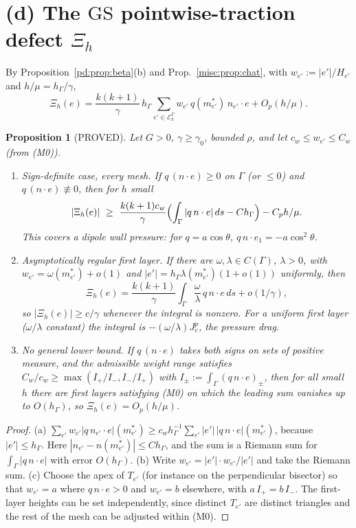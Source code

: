 \documentclass[11pt,reqno]{amsart}
\theoremstyle{plain}
\newtheorem{proposition}[theorem]{Proposition}
\theoremstyle{definition}
\newcommand{\hG}{h_\Gamma}
\newcommand{\EG}{\mathcal E_h^\Gamma}
\newcommand{\GS}{\mathrm{GS}}
\begin{document}
\section{(d) The \texorpdfstring{$\GS$}{GS} pointwise-traction defect \texorpdfstring{$\Xi_h$}{Xi_h}}\label{misc:sec:d}

By Proposition~\ref{pd:prop:beta}(b) and Prop.~\ref{misc:prop:chat}, with $w_{e'}:=|e'|/H_{e'}$ and $h/\mu=\hG/\gamma$,
\[
\Xi_h(e)=\frac{k(k+1)}{\gamma}\,\hG\sum_{e'\in\EG}w_{e'}\,q(m^\ast_{e'})\,n_{e'}\cdot e+O_p(h/\mu).
\]

\begin{proposition}[PROVED]\label{misc:prop:D}
Let $G>0$, $\gamma\ge\gamma_0$, bounded $\rho$, and let $c_w\le w_{e'}\le C_w$ (from (M0)).
\begin{enumerate}[label=(\alph*)]
\item \emph{Sign-definite case, every mesh.} If $q\,(n\cdot e)\ge0$ on $\Gamma$ (or $\le0$) and $q\,(n\cdot e)\not\equiv0$, then for $h$ small
\[
|\Xi_h(e)|\ \ge\ \frac{k(k+1)c_w}{\gamma}\Bigl(\int_\Gamma|q\,n\cdot e|\,ds-C\hG\Bigr)-C_ph/\mu .
\]
This covers a dipole wall pressure: for $q=a\cos\theta$, $q\,n\cdot e_1=-a\cos^2\theta$.
\item \emph{Asymptotically regular first layer.} If there are $\omega,\lambda\in C(\Gamma)$, $\lambda>0$, with $w_{e'}=\omega(m^\ast_{e'})+o(1)$ and $|e'|=\hG\lambda(m^\ast_{e'})(1+o(1))$ uniformly, then
\[
\Xi_h(e)=\frac{k(k+1)}{\gamma}\int_\Gamma\frac\omega\lambda\,q\,n\cdot e\,ds+o(1/\gamma),
\]
so $|\Xi_h(e)|\ge c/\gamma$ whenever the integral is nonzero. For a uniform first layer ($\omega/\lambda$ constant) the integral is $-(\omega/\lambda)J^p_e$, the pressure drag.
\item \emph{No general lower bound.} If $q\,(n\cdot e)$ takes both signs on sets of positive measure, and the admissible weight range satisfies $C_w/c_w\ge\max(I_+/I_-,I_-/I_+)$ with $I_\pm:=\int_\Gamma(q\,n\cdot e)_\pm$, then for all small $h$ there are first layers satisfying (M0) on which the leading sum vanishes up to $O(\hG)$, so $\Xi_h(e)=O_p(h/\mu)$.
\end{enumerate}
\end{proposition}

\begin{proof}
(a) $\sum_{e'}w_{e'}|q\,n_{e'}\cdot e|(m^\ast_{e'})\ge c_w\hG^{-1}\sum_{e'}|e'|\,|q\,n\cdot e|(m^\ast_{e'})$, because $|e'|\le\hG$. Here $|n_{e'}-n(m^\ast_{e'})|\le C\hG$, and the sum is a Riemann sum for $\int_\Gamma|q\,n\cdot e|$ with error $O(\hG)$. (b) Write $w_{e'}=|e'|\cdot w_{e'}/|e'|$ and take the Riemann sum. (c) Choose the apex of $T_{e'}$ (for instance on the perpendicular bisector) so that $w_{e'}=a$ where $q\,n\cdot e>0$ and $w_{e'}=b$ elsewhere, with $a\,I_+=b\,I_-$. The first-layer heights can be set independently, since distinct $T_{e'}$ are distinct triangles and the rest of the mesh can be adjusted within (M0).
\end{proof}
\end{document}
